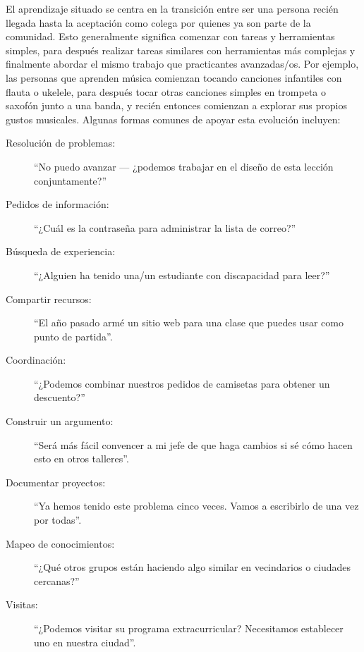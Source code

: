 El aprendizaje situado se centra en la transición entre ser una persona recién llegada
hasta la aceptación como colega por quienes ya son parte de la comunidad.
Esto generalmente significa comenzar con tareas y herramientas simples,
para después realizar tareas similares con herramientas más complejas
y finalmente abordar el mismo trabajo que practicantes avanzadas/os.
Por ejemplo,
las personas que aprenden música comienzan tocando canciones infantiles con flauta o ukelele, para
después tocar otras canciones simples en trompeta o saxofón junto a una banda,
y recién entonces comienzan a explorar sus propios gustos musicales.
Algunas formas comunes de apoyar esta evolución incluyen:

\newpage
\begin{description}

\item[Resolución de problemas:]
  ``No puedo avanzar --- ¿podemos trabajar en el diseño de esta lección conjuntamente?''

\item[Pedidos de información:]
  ``¿Cuál es la contraseña para administrar la lista de correo?''

\item[Búsqueda de experiencia:]
  ``¿Alguien ha tenido una/un estudiante con discapacidad para leer?''

\item[Compartir recursos:]
  ``El año pasado armé un sitio web para una clase que puedes usar como punto de partida''.
  
\item[Coordinación:]
  ``¿Podemos combinar nuestros pedidos de camisetas para obtener un descuento?''

\item[Construir un argumento:]
  ``Será más fácil convencer a mi jefe de que haga cambios si sé cómo hacen esto en otros talleres''.

\item[Documentar proyectos:]
  ``Ya hemos tenido este problema cinco veces. Vamos a escribirlo de una vez por todas''.

\item[Mapeo de conocimientos:]
  ``¿Qué otros grupos están haciendo algo similar en vecindarios o ciudades cercanas?''

\item[Visitas:]
  ``¿Podemos visitar su programa extracurricular? Necesitamos establecer uno en nuestra ciudad''.

\end{description}

